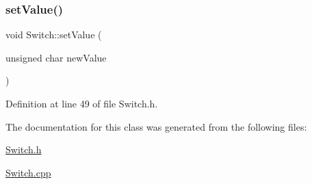 \subsubsection{\texorpdfstring{set\+Value()}{setValue()}}
{\footnotesize\ttfamily void Switch\+::set\+Value (\begin{DoxyParamCaption}\item[{unsigned char}]{new\+Value }\end{DoxyParamCaption})\hspace{0.3cm}{\ttfamily [inline]}}



Definition at line 49 of file Switch.\+h.



The documentation for this class was generated from the following files\+:\begin{DoxyCompactItemize}
\item 
\hyperlink{_switch_8h}{Switch.\+h}\item 
\hyperlink{_switch_8cpp}{Switch.\+cpp}\end{DoxyCompactItemize}
